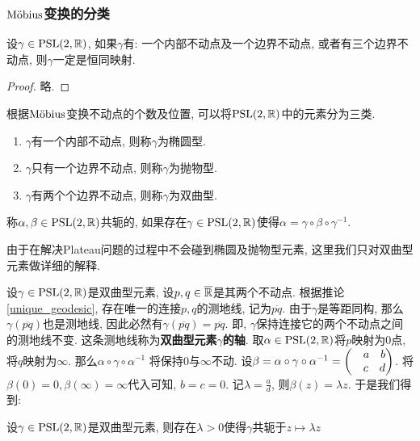 \subsubsection{${\text{M\"obius}}$变换的分类}
\begin{proposition}
    设$\gamma \in {\text{PSL}}(2,{\mathbb{R}})$, 如果$\gamma$有: 一个内部不动点及一个边界不动点, 或者有三个边界不动点, 则$\gamma$一定是恒同映射.  
\end{proposition}
\begin{proof}
    略.
\end{proof}
根据${\text{M\"obius}}$变换不动点的个数及位置, 可以将${\text{PSL}}(2,{\mathbb{R}})$中的元素分为三类. 
\begin{enumerate}
    \item $\gamma$有一个内部不动点, 则称$\gamma$为椭圆型.
    \item $\gamma$只有一个边界不动点, 则称$\gamma$为抛物型.
    \item $\gamma$有两个个边界不动点, 则称$\gamma$为双曲型.
\end{enumerate}
\begin{definition}
    称$\alpha, \beta \in {\text{PSL}}(2,{\mathbb{R}})$共轭的, 如果存在$\gamma \in {\text{PSL}}(2,{\mathbb{R}})$使得$\alpha=\gamma \circ \beta \circ \gamma^{-1}$.
\end{definition}
\par 由于在解决Plateau问题的过程中不会碰到椭圆及抛物型元素, 这里我们只对双曲型元素做详细的解释. 
\par 设$\gamma\in {\text{PSL}}(2,{\mathbb{R}})$是双曲型元素, 设$p,q \in {\overline{\mathbb{R}}}$是其两个不动点.  根据推论\eqref{unique_geodesic},  存在唯一的连接$p,q$的测地线, 记为$\overline{pq}$. 由于$\gamma$是等距同构, 那么$\gamma(\overline{pq})$也是测地线, 因此必然有$\gamma(\overline{pq})=\overline{pq}$.  即, $\gamma$保持连接它的两个不动点之间的测地线不变. 这条测地线称为\textbf{双曲型元素$\gamma$的轴}. 取$\alpha\in {\text{PSL}}(2,{\mathbb{R}})$将$p$映射为$0$点, 将$q$映射为$\infty$. 那么$\alpha\circ\gamma \circ \alpha^{-1}$ 将保持$0$与$\infty$不动. 
设$\beta= \alpha \circ \gamma \circ \alpha^{-1}=\begin{pmatrix}
    &a{\quad} b\\
    &c{\quad} d
\end{pmatrix}$.  将$\beta(0)=0, \beta(\infty)=\infty$代入可知, $b=c=0$.  记$\lambda=\frac{a}{d}$, 则$\beta(z)=\lambda z$.
于是我们得到:
\begin{proposition}
    设$\gamma \in {\text{PSL}}(2,{\mathbb{R}})$是双曲型元素, 则存在$\lambda >0$使得$\gamma$共轭于$z \mapsto \lambda z$
\end{proposition}
